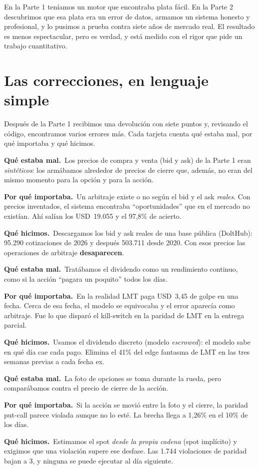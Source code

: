 \documentclass[11pt,a4paper]{article}
\newcommand{\correccion}[4]{%
\begin{tcolorbox}[enhanced,colback=white,colframe=grid,boxrule=0.8pt,arc=3pt,left=9pt,right=9pt,top=6pt,bottom=6pt,
  title={\sffamily\bfseries #1},colbacktitle=navy,coltitle=white,fonttitle=\sffamily\bfseries\small,before skip=7pt,after skip=7pt]
{\sffamily\small\bfseries\color{alert}Qué estaba mal.}\ #2\par\vspace{3pt}
{\sffamily\small\bfseries\color{amber!80!black}Por qué importaba.}\ #3\par\vspace{3pt}
{\sffamily\small\bfseries\color{aqua!70!black}Qué hicimos.}\ #4
\end{tcolorbox}}
\newcommand{\usd}[1]{USD~#1}
\begin{document}
\begin{criollo}
En la Parte 1 teníamos un motor que encontraba plata fácil. En la Parte 2 descubrimos que esa plata era un error de
datos, armamos un sistema honesto y profesional, y lo pusimos a prueba contra siete años de mercado real. El
resultado es menos espectacular, pero es verdad, y está medido con el rigor que pide un trabajo cuantitativo.
\end{criollo}

\newpage
\section{Las correcciones, en lenguaje simple}

Después de la Parte 1 recibimos una devolución con siete puntos y, revisando el código, encontramos varios errores
más. Cada tarjeta cuenta qué estaba mal, por qué importaba y qué hicimos.

\correccion{1 · Precios inventados}
{Los precios de compra y venta (bid y ask) de la Parte 1 eran \emph{sintéticos}: los armábamos alrededor de precios
de cierre que, además, no eran del mismo momento para la opción y para la acción.}
{Un arbitraje existe o no según el bid y el ask \emph{reales}. Con precios inventados, el sistema encontraba
``oportunidades'' que en el mercado no existían. Ahí salían los \usd{19.055} y el 97,8\% de acierto.}
{Descargamos los bid y ask reales de una base pública (DoltHub): 95.290 cotizaciones de 2026 y después 503.711 desde
2020. Con esos precios las operaciones de arbitraje \textbf{desaparecen}.}

\correccion{2 · El dividendo repartido en todos los días}
{Tratábamos el dividendo como un rendimiento continuo, como si la acción ``pagara un poquito'' todos los días.}
{En la realidad LMT paga \usd{3,45} de golpe en una fecha. Cerca de esa fecha, el modelo se equivocaba y el error
aparecía como arbitraje. Fue lo que disparó el kill-switch en la paridad de LMT en la entrega parcial.}
{Usamos el dividendo discreto (modelo \emph{escrowed}): el modelo sabe en qué día cae cada pago. Elimina el 41\% del
edge fantasma de LMT en las tres semanas previas a cada fecha ex.}

\correccion{3 · La foto y el cierre no son del mismo momento}
{La foto de opciones se toma durante la rueda, pero comparábamos contra el precio de cierre de la acción.}
{Si la acción se movió entre la foto y el cierre, la paridad put-call parece violada aunque no lo esté. La brecha
llega a 1,26\% en el 10\% de los días.}
{Estimamos el spot \emph{desde la propia cadena} (spot implícito) y exigimos que una violación supere ese desfase.
Las 1.744 violaciones de paridad bajan a 3, y ninguna se puede ejecutar al día siguiente.}
\end{document}
